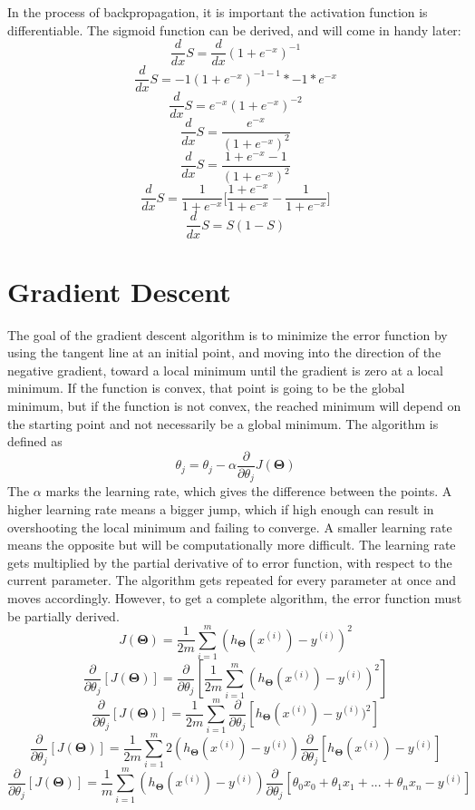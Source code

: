 \documentclass[a4paper,12pt]{article}
\begin{document}
In the process of backpropagation, it is important the activation function is differentiable. The sigmoid function can be derived, and will come in handy later:
\[\frac{d}{dx}S = \frac{d}{dx}(1+e^{-x})^{-1}\]
\[\frac{d}{dx}S = -1(1+e^{-x})^{-1-1} * -1 * e^{-x}\]
\[\frac{d}{dx}S = e^{-x}(1+e^{-x})^{-2}\]
\[\frac{d}{dx}S = \frac{e^{-x}}{(1+e^{-x})^2}\]
\[\frac{d}{dx}S = \frac{1 + e^{-x} - 1}{(1+e^{-x})^2}\]
\[\frac{d}{dx}S = \frac{1}{1+e^{-x}}\bigg[\frac{1+e^{-x}}{1+e^{-x}} - \frac{1}{1+e^{-x}}\bigg] \]
\[\frac{d}{dx}S = S(1-S)\]

\section{Gradient Descent}
The goal of the gradient descent algorithm is to minimize the error function by using the tangent line at an initial point, and moving into the direction of the negative gradient, toward a local minimum until the gradient is zero at a local minimum. If the function is convex, that point is going to be the global minimum, but if the function is not convex, the reached minimum will depend on the starting point and not necessarily be a global minimum. The algorithm is defined as \[\theta_j = \theta_j - \alpha \frac{\partial}{\partial\theta_j} J(\boldsymbol{\Theta})\] The \(\alpha\) marks the learning rate, which gives the difference between the points. A higher learning rate means a bigger jump, which if high enough can result in overshooting the local minimum and failing to converge. A smaller learning rate means the opposite but will be computationally more difficult. The learning rate gets multiplied by the partial derivative of to error function, with respect to the current parameter. The algorithm gets repeated for every parameter at once and moves accordingly. However, to get a complete algorithm, the error function must be partially derived. 
\[J(\boldsymbol{\Theta}) = \frac{1}{2m} \sum_{i=1}^m (h_{\boldsymbol{\Theta}}(x^{(i)}) - y^{(i)})^2\]
\[\frac{\partial}{\partial\theta_j} [J(\boldsymbol{\Theta})] = \frac{\partial}{\partial\theta_j} [\frac{1}{2m} \sum_{i=1}^m (h_{\boldsymbol{\Theta}}(x^{(i)}) - y^{(i)})^2]\]
\[\frac{\partial}{\partial\theta_j} [J(\boldsymbol{\Theta})] = \frac{1}{2m} \sum_{i=1}^m \frac{\partial}{\partial\theta_j} [h_{\boldsymbol{\Theta}}(x^{(i)}) - y^{(i)})^2]\]
\[\frac{\partial}{\partial\theta_j} [J(\boldsymbol{\Theta})] = \frac{1}{2m} \sum_{i=1}^m 2(h_{\boldsymbol{\Theta}}(x^{(i)}) - y^{(i)}) \frac{\partial}{\partial\theta_j}[h_{\boldsymbol{\Theta}}(x^{(i)}) - y^{(i)}]\]
\[\frac{\partial}{\partial\theta_j} [J(\boldsymbol{\Theta})] = \frac{1}{m} \sum_{i=1}^m (h_{\boldsymbol{\Theta}}(x^{(i)}) - y^{(i)})\frac{\partial}{\partial\theta_j} [\theta_0x_0+\theta_1x_1+...+\theta_nx_n-y^{(i)}]\]
\end{document}
